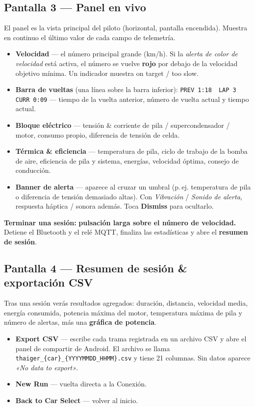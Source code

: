 \documentclass[11pt,a4paper,oneside]{report}
\newcommand{\midsep}{\,\textperiodcentered\,}
\newcommand{\ok}{\textcolor{tgreen}{\ding{51}}}
\newcommand{\nope}{\textcolor{tred}{\ding{55}}}
\newcommand{\code}[1]{\texttt{#1}}
\begin{document}
\subsection{Pantalla 3 --- Panel en vivo}
El panel es la vista principal del piloto (horizontal, pantalla encendida). Muestra
en continuo el último valor de cada campo de telemetría.
\begin{itemize}
  \item \textbf{Velocidad} --- el número principal grande (km/h). Si la \emph{alerta
    de color de velocidad} está activa, el número se vuelve \textbf{rojo} por debajo
    de la velocidad objetivo mínima. Un indicador muestra \ok{} on target /
    \nope{} too slow.
  \item \textbf{Barra de vueltas} (una línea sobre la barra inferior):
    \code{PREV 1:18} \midsep{} \code{LAP 3} \midsep{} \code{CURR 0:09} --- tiempo de
    la vuelta anterior, número de vuelta actual y tiempo actual.
  \item \textbf{Bloque eléctrico} --- tensión \& corriente de pila /
    supercondensador / motor, consumo propio, diferencia de tensión de celda.
  \item \textbf{Térmica \& eficiencia} --- temperatura de pila, ciclo de trabajo de
    la bomba de aire, eficiencia de pila y sistema, energías, velocidad óptima,
    consejo de conducción.
  \item \textbf{Banner de alerta} --- aparece al cruzar un umbral (p.\,ej.
    temperatura de pila o diferencia de tensión demasiado altas). Con
    \emph{Vibración} / \emph{Sonido de alerta}, respuesta háptica / sonora además.
    Toca \textbf{Dismiss} para ocultarlo.
\end{itemize}
\begin{tgnote}
\textbf{Terminar una sesión:} \textbf{pulsación larga sobre el número de
velocidad.} Detiene el Bluetooth y el relé MQTT, finaliza las estadísticas y abre el
\textbf{resumen de sesión}.
\end{tgnote}

\subsection{Pantalla 4 --- Resumen de sesión \& exportación CSV}
Tras una sesión verás resultados agregados: duración, distancia, velocidad media,
energía consumida, potencia máxima del motor, temperatura máxima de pila y número de
alertas, más una \textbf{gráfica de potencia}.
\begin{itemize}
  \item \textbf{Export CSV} --- escribe cada trama registrada en un archivo CSV y
    abre el panel de compartir de Android. El archivo se llama
    \code{thaiger\_\{car\}\_\allowbreak\{YYYYMMDD\_HHMM\}.csv} y tiene 21 columnas.
    Sin datos aparece \emph{«No data to export»}.
  \item \textbf{New Run} --- vuelta directa a la Conexión.
  \item \textbf{Back to Car Select} --- volver al inicio.
\end{itemize}
\end{document}
